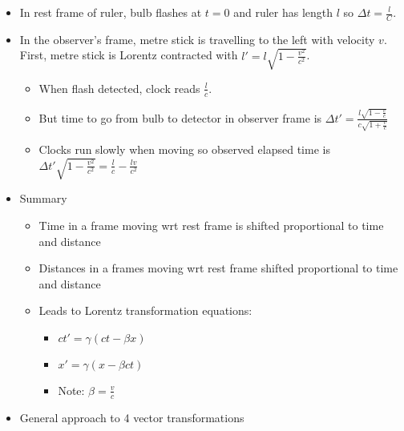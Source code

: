 \documentclass[12pt]{article}
\begin{document}
\begin{itemize}
    \item In rest frame of ruler, bulb flashes at $t=0$ and ruler has length $l$ so $\Delta t  =\frac{l}{C}$. 
    \item In the observer's frame, metre stick is travelling to the left with velocity $v$. First, metre stick is Lorentz contracted with $l' = l \sqrt{1 - \frac{v^2}{c^2}}$. \begin{itemize}
        \item When flash detected, clock reads $\frac{l}{c}$.
        \item But time to go from bulb to detector in observer frame is $\Delta t' = \frac{l \sqrt{1 - \frac{v}{c}}}{c \sqrt{1 + \frac{v}{c}}}$
        \item Clocks run slowly when moving so observed elapsed time is $\Delta t' \sqrt{1 - \frac{v^2}{c^2} } = \frac{l}{c} - \frac{lv}{c^2}$
    \end{itemize}
    \item Summary \begin{itemize}
        \item Time in a frame moving wrt rest frame is shifted proportional to time and distance
        \item Distances in a frames moving wrt rest frame shifted proportional to time and distance
        \item Leads to Lorentz transformation equations: \begin{itemize}
            \item $ct' = \gamma (ct - \beta x)$
            \item $x' = \gamma (x - \beta ct)$ 
            \item Note:  $\beta = \frac{v}{c}$
        \end{itemize}
    \end{itemize}
    \item General approach to 4 vector transformations 
\end{itemize}
\end{document}
